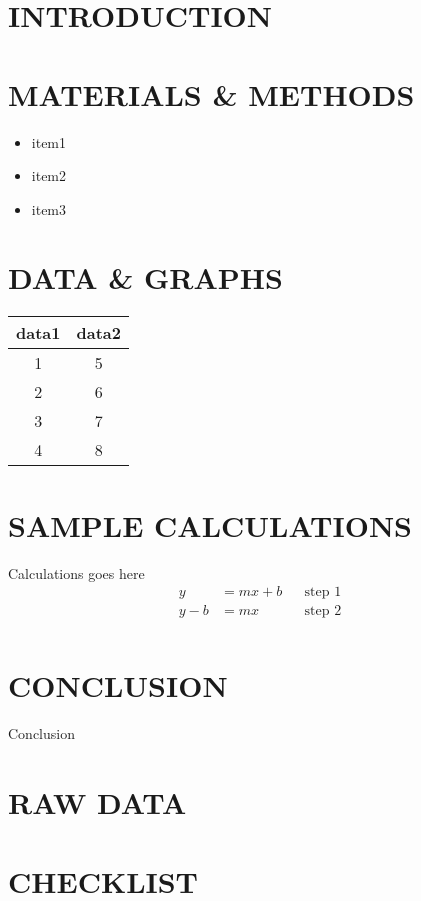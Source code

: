 \documentclass{article}
\title{\experimentTitle{}}
\author{
    \first{} \last{}\\
    Partners:\\
    \partners{}\\
    Instructor: \instructor{}
}
\begin{document}
\clearpage
\maketitle
\thispagestyle{empty}
\clearpage
{}
\newpage

\pagestyle{useheader}
\tableofcontents
\newpage

\section{INTRODUCTION}
\section{MATERIALS \& METHODS}
    \begin{itemize}
        \item item1
        \item item2
        \item item3
    \end{itemize}
\section{DATA \& GRAPHS}
    \begin{tabular}{ |c|c| } 
        \hline
            data1 & data2 \\
        \hline
        1 & 5 \\
        2 & 6 \\
        3 & 7 \\
        4 & 8 \\
        \hline
        \end{tabular}
\section{SAMPLE CALCULATIONS}
    Calculations goes here
    \begin{align*}
        y &= mx + b && \text{step 1}\\
        y - b &= mx && \text{step 2}\\
    \end{align*}
\section{CONCLUSION}
Conclusion
\section{RAW DATA}
\section{CHECKLIST}
\end{document}
